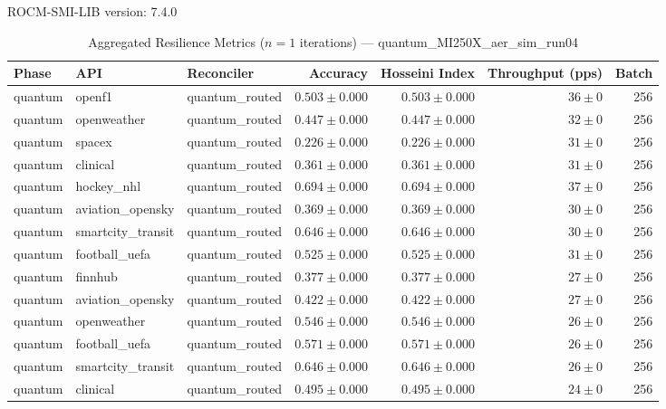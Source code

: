 ROCM-SMI-LIB version: 7.4.0

\begin{table}[htbp]
\caption{Aggregated Resilience Metrics ($n=1$ iterations) --- quantum_MI250X_aer_sim_run04}
\begin{tabular}{l l l r r r r}
\hline
Phase & API & Reconciler & Accuracy & Hosseini Index & Throughput (pps) & Batch \\
\hline
quantum & openf1 & quantum\_routed & $0.503\pm0.000$ & $0.503\pm0.000$ & $36\pm0$ & 256 \\
quantum & openweather & quantum\_routed & $0.447\pm0.000$ & $0.447\pm0.000$ & $32\pm0$ & 256 \\
quantum & spacex & quantum\_routed & $0.226\pm0.000$ & $0.226\pm0.000$ & $31\pm0$ & 256 \\
quantum & clinical & quantum\_routed & $0.361\pm0.000$ & $0.361\pm0.000$ & $31\pm0$ & 256 \\
quantum & hockey\_nhl & quantum\_routed & $0.694\pm0.000$ & $0.694\pm0.000$ & $37\pm0$ & 256 \\
quantum & aviation\_opensky & quantum\_routed & $0.369\pm0.000$ & $0.369\pm0.000$ & $30\pm0$ & 256 \\
quantum & smartcity\_transit & quantum\_routed & $0.646\pm0.000$ & $0.646\pm0.000$ & $30\pm0$ & 256 \\
quantum & football\_uefa & quantum\_routed & $0.525\pm0.000$ & $0.525\pm0.000$ & $31\pm0$ & 256 \\
quantum & finnhub & quantum\_routed & $0.377\pm0.000$ & $0.377\pm0.000$ & $27\pm0$ & 256 \\
quantum & aviation\_opensky & quantum\_routed & $0.422\pm0.000$ & $0.422\pm0.000$ & $27\pm0$ & 256 \\
quantum & openweather & quantum\_routed & $0.546\pm0.000$ & $0.546\pm0.000$ & $26\pm0$ & 256 \\
quantum & football\_uefa & quantum\_routed & $0.571\pm0.000$ & $0.571\pm0.000$ & $26\pm0$ & 256 \\
quantum & smartcity\_transit & quantum\_routed & $0.646\pm0.000$ & $0.646\pm0.000$ & $26\pm0$ & 256 \\
quantum & clinical & quantum\_routed & $0.495\pm0.000$ & $0.495\pm0.000$ & $24\pm0$ & 256 \\

\end{tabular}
\end{table}

